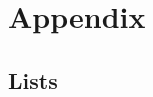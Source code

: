 \documentclass  [
  paper    = a4,
  BCOR     = 10mm,
  twoside,
  fontsize = 12pt,
  fleqn,
  toc      = bibnumbered,
  toc      = listofnumbered,
  numbers  = noendperiod,
  headings = normal,
  listof   = leveldown,
  version  = 3.03
]                                       {scrreprt}
\newcommand{\<}{\langle}
\renewcommand{\>}{\rangle}
\begin{document}
   
   
   
   
   
   
   
   
   \newpage
  \part{Appendix}
  \begin{appendix}
    \chapter{Lists}
    {}
    
    
  \end{appendix}
\end{document}
